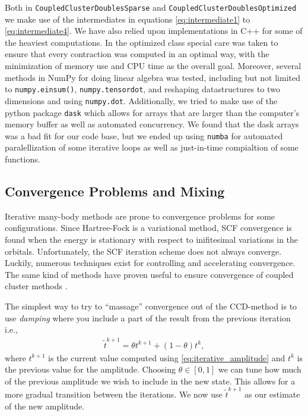 \documentclass[
    a4paper, aps, twocolumn, floatfix, superscriptaddress,
    nofootinbib]{revtex4-1}
\newcommand{\1}{\mathds{1}}
\begin{document}
        Both in \texttt{CoupledClusterDoublesSparse} and
        \texttt{CoupledClusterDoublesOptimized} we make use
        of the intermediates in equations \ref{eq:intermediate1} to
        \ref{eq:intermediate4}. We have also relied upon implementations
        in C++ for some of the heaviest computations. In the optimized
        class special care was taken to ensure that every contraction
        was computed in an optimal way, with the minimization of memory
        use and CPU time as the overall goal. Moreover, several methods
        in NumPy for doing linear algebra was tested, including but not limited
        to \texttt{numpy.einsum()}, \texttt{numpy.tensordot},
        and reshaping datastructures to two dimensions and using 
        \texttt{numpy.dot}. Additionally, we tried to make use of 
        the python package \texttt{dask} which allows for arrays that
        are larger than the computer's memory buffer as well as automated
        concurrency. We found that the dask arrays was a bad fit for our code
        base, but we ended up using \texttt{numba} for automated
        paralellization of some iterative loops as well as just-in-time
        compialtion of some functions. 

    \subsection{Convergence Problems and Mixing}

        Iterative many-body methods are prone to convergence problems for some
        configurations. Since Hartree-Fock is a variational method, SCF convergence
        is found when the energy is stationary with respect to inifitesimal 
        variations in the orbitals. Unfortunately, the SCF iteration scheme does 
        not always converge. Luckily, numerous techniques exist for controlling
        and accelerating convergence\cite{schlegel1991you}. The same kind of 
        methods have proven useful to ensure convergence of coupled cluster methods
        \cite{scuseria1986accelerating}.

        The simplest way to try to ``massage'' convergence out of the CCD-method 
        is to use \emph{damping} where you include a part of the result from the
        previous iteration i.e.,
        \begin{align}
            \tilde{t}^{k + 1} = \theta t^{k + 1} + (1 - \theta)t^k,
            \label{eq:mixing}
        \end{align}
        where $t^{k + 1}$ is the current value computed using
        \autoref{eq:iterative_amplitude} and $t^k$ is the previous value for the
        amplitude. Choosing $\theta \in [0, 1]$ we can tune how much of the
        previous amplitude we wish to include in the new state. This allows for
        a more gradual transition between the iterations. We now use
        $\tilde{t}^{k + 1}$ as our estimate of the new amplitude.
\end{document}
